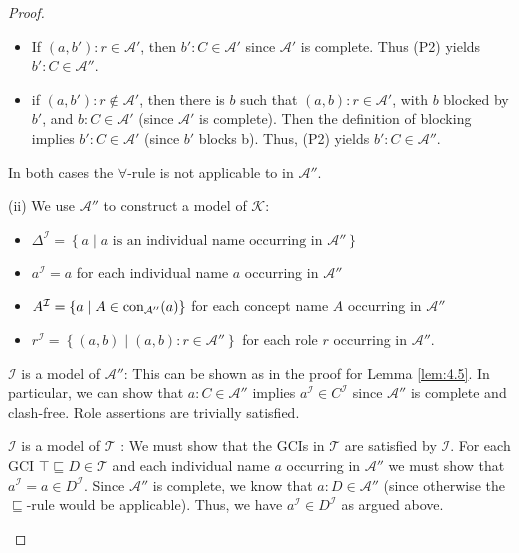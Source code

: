 \begin{proof}
\begin{enumerate}
\begin{subproof}
\begin{itemize}
\begin{itemize}
							\item If $\left( a,b' \right):r \in \mathcal{A}'$, then $b':C \in \mathcal{A}'$ since $\mathcal{A'}$ is complete.
								Thus (P2) yields $b' :C \in \mathcal{A}''$.
							\item if $\left( a,b' \right):r \notin \mathcal{A}'$, then there is $b$ such that
								$\left( a,b \right):r \in \mathcal{A}'$, with $b$ blocked by $b'$,
								and $b:C \in \mathcal{A}'$ (since $\mathcal{A}'$ is complete).
								Then the definition of blocking implies $b':C \in \mathcal{A}'$ (since $b'$ blocks b).
								Thus, (P2) yields $b':C \in \mathcal{A}''$.
						\end{itemize}
						In both cases the $\forall$-rule is not applicable to in $\mathcal{A}''$.
						\qedhere
				\end{itemize}
			\end{subproof}
	\end{enumerate}
	(ii) We use $\mathcal{A}''$ to construct a model of $\mathcal{K}$:
	\begin{itemize}
		\item $\Delta^\mathcal{I} = \left\{ a \mid a \text{ is an individual name occurring in $\mathcal{A}''$} \right\}$
			\item $a^\mathcal{I} = a$ for each individual name $a$ occurring in $\mathcal{A}''$ 
			\item $A^\mathcal{I} = \left\{ a \mid A \in \operatorname{\text{con}}_{\mathcal{A}''}(a) \right\}$ for each concept name $A$ occurring in $\mathcal{A}''$ 
			\item $r^\mathcal{I} = \left\{ (a,b) \mid (a,b):r \in \mathcal{A}'' \right\}$ for each role $r$ occurring in $\mathcal{A}''$.
	\end{itemize}
	\begin{subproof}
		$\mathcal{I}$ is a model of $\mathcal{A}''$: This can be shown as in the proof for Lemma \ref{lem:4.5}.
		In particular, we can show that $a : C \in \mathcal{A}''$ implies $a^\mathcal{I} \in C^\mathcal{I}$
		since $\mathcal{A}''$ is complete and clash-free.
		Role assertions are trivially satisfied.

		$\mathcal{I}$ is a model of $\mathcal{T}$ : We must show that the GCIs in $\mathcal{T}$ are satisfied by $\mathcal{I}$.
		For each GCI $\top \sqsubseteq D \in \mathcal{T}$ and
		each individual name $a$ occurring in $\mathcal{A}''$ we must show that $a^\mathcal{I}=a \in D^\mathcal{I}$.
		Since $\mathcal{A}''$ is complete, we know that $a:D \in \mathcal{A}''$
		(since otherwise the $\sqsubseteq$-rule would be applicable).
		Thus, we have $a^\mathcal{I} \in D^\mathcal{I}$ as argued above.
		\qedhere
	\end{subproof}
\end{proof}
